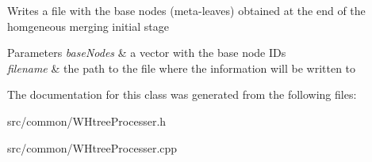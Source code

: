 \-Writes a file with the base nodes (meta-\/leaves) obtained at the end of the homgeneous merging initial stage 
\begin{DoxyParams}{\-Parameters}
{\em base\-Nodes} & a vector with the base node \-I\-Ds \\
\hline
{\em filename} & the path to the file where the information will be written to \\
\hline
\end{DoxyParams}


\-The documentation for this class was generated from the following files\-:\begin{DoxyCompactItemize}
\item 
src/common/\-W\-Htree\-Processer.\-h\item 
src/common/\-W\-Htree\-Processer.\-cpp\end{DoxyCompactItemize}
